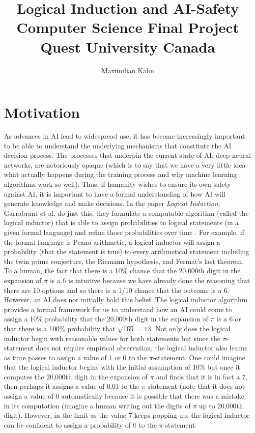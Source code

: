 \documentclass{article}
\begin{document}
\title{%
  Logical Induction and AI-Safety  \\
  \large Computer Science Final Project \\
    Quest University Canada}
\author{Maximilian Kahn}

\maketitle


\section{Motivation}
As advances in AI lead to widespread use, it has become increasingly important to be able to understand the underlying mechanisms that constitute the AI decision-process. The processes that underpin the current state of AI, deep neural networks, are notoriously opaque (which is to say that we have a very little idea what actually happens during the training process and why machine learning algorithms work so well). \cite{Computerphile} Thus, if humanity wishes to ensure its own safety against AI, it is important to have a formal understanding of how AI will generate knowledge and make decisions. In the paper \textit{Logical Induction}, Garrabrant et al. do just this; they formulate a computable algorithm (called the logical inductor) that is able to assign probabilities to logical statements (in a given formal language) and refine those probabilities over time \cite{Garrabrant}. For example, if the formal language is Peano arithmetic, a logical inductor will assign a probability (that the statement is true) to every arithmetical statement including the twin prime conjecture, the Riemann hypothesis, and Fermat's last theorem. To a human, the fact that there is a 10\% chance that the 20,000th digit in the expansion of $\pi$ is a 6 is intuitive because we have already done the reasoning that there are 10 options and so there is a 1/10 chance that the outcome is a 6. However, an AI does not initially hold this belief. The logical inductor algorithm provides a formal framework for us to understand how an AI could come to assign a 10\% probability that the 20,000th digit in the expansion of $\pi$ is a 6 or that there is a 100\% probability that $\sqrt{169} = 13$. Not only does the logical inductor begin with reasonable values for both statements but since the $\pi$-statement does not require empirical observation, the logical inductor also learns as time passes to assign a value of 1 or 0 to the $\pi$-statement. One could imagine that the logical inductor begins with the initial assumption of 10\% but once it computes the 20,000th digit in the expansion of $\pi$ and finds that it is in fact a 7, then perhaps it assigns a value of 0.01 to the $\pi$-statement (note that it does not assign a value of 0 automatically because it is possible that there was a mistake in its computation (imagine a human writing out the digits of $\pi$ up to 20,000th digit). However, in the limit as the value 7 keeps popping up, the logical inductor can be confident to assign a probability of 0 to the $\pi$-statement.
\end{document}
